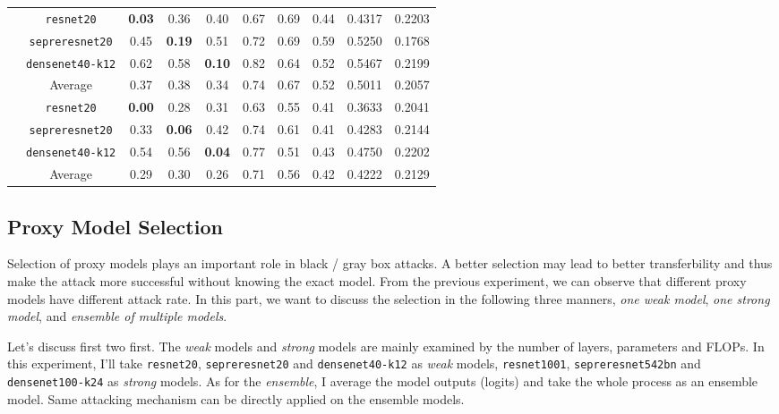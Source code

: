 \documentclass{article}
\begin{document}
\begin{table}
\begin{tabular}{cccccccccc}
                          & \texttt{resnet20}       & \textbf{0.03} & 0.36 & 0.40 & 0.67 & 0.69 & 0.44 & 0.4317 & 0.2203 \\
                          & \texttt{sepreresnet20}  & 0.45 & \textbf{0.19} & 0.51 & 0.72 & 0.69 & 0.59 & 0.5250 & 0.1768 \\
                          & \texttt{densenet40-k12} & 0.62 & 0.58 & \textbf{0.10} & 0.82 & 0.64 & 0.52 & 0.5467 & 0.2199 \\
                          & Average                 & 0.37 & 0.38 & 0.34 & 0.74 & 0.67 & 0.52 & 0.5011 & 0.2057 \\
    \midrule

                          & \texttt{resnet20}       & \textbf{0.00} & 0.28 & 0.31 & 0.63 & 0.55 & 0.41 & 0.3633 & 0.2041 \\
                          & \texttt{sepreresnet20}  & 0.33 & \textbf{0.06} & 0.42 & 0.74 & 0.61 & 0.41 & 0.4283 & 0.2144 \\
                          & \texttt{densenet40-k12} & 0.54 & 0.56 & \textbf{0.04} & 0.77 & 0.51 & 0.43 & 0.4750 & 0.2202 \\
                          & Average                 & 0.29 & 0.30 & 0.26 & 0.71 & 0.56 & 0.42 & 0.4222 & 0.2129 \\
    \bottomrule
  \end{tabular}
\end{table}

\subsection{Proxy Model Selection}
Selection of proxy models plays an important role in black / gray box attacks. A better selection may lead to better transferbility and thus make the attack more successful without knowing the exact model. From the previous experiment, we can observe that different proxy models have different attack rate. In this part, we want to discuss the selection in the following three manners, \textit{one weak model}, \textit{one strong model}, and \textit{ensemble of multiple models}.

Let's discuss first two first. The \textit{weak} models and \textit{strong} models are mainly examined by the number of layers, parameters and FLOPs. In this experiment, I'll take \texttt{resnet20}, \texttt{sepreresnet20} and \texttt{densenet40-k12} as \textit{weak} models, \texttt{resnet1001}, \texttt{sepreresnet542bn} and \texttt{densenet100-k24} as \textit{strong} models. As for the \textit{ensemble}, I average the model outputs (logits) and take the whole process as an ensemble model. Same attacking mechanism can be directly applied on the ensemble models.
\end{document}
